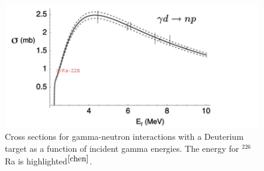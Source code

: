 \documentclass[%
12pt,
twoside,
reprint,
amsmath,amssymb,
aps,
]{article}
\begin{document}
	\begin{figure}[H]
		\includegraphics[scale = 1.8, center]{Images/deuterium_cross_section.png}
		\caption{\label{tab:table-name} Cross sections for gamma-neutron interactions with a Deuterium target as a function of incident gamma energies. The energy for $^{226}$Ra is highlighted$^{\cite{chen}}$.}
	\end{figure}
\end{document}
